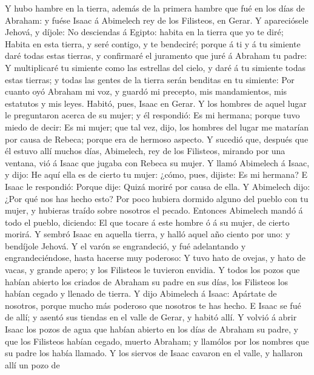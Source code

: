  Y hubo hambre en la tierra, además de la primera hambre que
fué en los días de Abraham: y fuése Isaac á Abimelech rey de los
Filisteos, en Gerar.  Y apareciósele Jehová, y díjole: No
desciendas á Egipto: habita en la tierra que yo te diré; 
Habita en esta tierra, y seré contigo, y te bendeciré; porque á ti y á
tu simiente daré todas estas tierras, y confirmaré el juramento que juré
á Abraham tu padre:  Y multiplicaré tu simiente como las
estrellas del cielo, y daré á tu simiente todas estas tierras; y todas
las gentes de la tierra serán benditas en tu simiente:  Por
cuanto oyó Abraham mi voz, y guardó mi precepto, mis mandamientos, mis
estatutos y mis leyes.  Habitó, pues, Isaac en Gerar.
 Y los hombres de aquel lugar le preguntaron acerca de su
mujer; y él respondió: Es mi hermana; porque tuvo miedo de decir: Es mi
mujer; que tal vez, dijo, los hombres del lugar me matarían por causa de
Rebeca; porque era de hermoso aspecto.  Y sucedió que,
después que él estuvo allí muchos días, Abimelech, rey de los Filisteos,
mirando por una ventana, vió á Isaac que jugaba con Rebeca su mujer.
 Y llamó Abimelech á Isaac, y dijo: He aquí ella es de
cierto tu mujer: ¿cómo, pues, dijiste: Es mi hermana? E Isaac le
respondió: Porque dije: Quizá moriré por causa de ella.  Y
Abimelech dijo: ¿Por qué nos has hecho esto? Por poco hubiera dormido
alguno del pueblo con tu mujer, y hubieras traído sobre nosotros el
pecado.  Entonces Abimelech mandó á todo el pueblo,
diciendo: El que tocare á este hombre ó á su mujer, de cierto morirá.
 Y sembró Isaac en aquella tierra, y halló aquel año ciento
por uno: y bendíjole Jehová.  Y el varón se engrandeció, y
fué adelantando y engrandeciéndose, hasta hacerse muy poderoso:
 Y tuvo hato de ovejas, y hato de vacas, y grande apero; y
los Filisteos le tuvieron envidia.  Y todos los pozos que
habían abierto los criados de Abraham su padre en sus días, los
Filisteos los habían cegado y llenado de tierra.  Y dijo
Abimelech á Isaac: Apártate de nosotros, porque mucho más poderoso que
nosotros te has hecho.  E Isaac se fué de allí; y asentó
sus tiendas en el valle de Gerar, y habitó allí.  Y volvió
á abrir Isaac los pozos de agua que habían abierto en los días de
Abraham su padre, y que los Filisteos habían cegado, muerto Abraham; y
llamólos por los nombres que su padre los había llamado.  Y
los siervos de Isaac cavaron en el valle, y hallaron allí un pozo de
